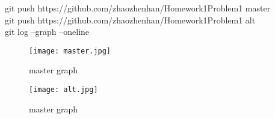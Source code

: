 \documentclass[12pt]{article}
\begin{document}
git push https://github.com/zhaozhenhan/Homework1Problem1 master\\
git push https://github.com/zhaozhenhan/Homework1Problem1 alt\\
git log --graph --oneline\\
\begin{figure}[h]
    \begin{center}
        \texttt{[image: master.jpg]}
    \end{center}
    \caption{master graph}
    \label{fig:branch}
\end{figure}
\begin{figure}[h]
    \begin{center}
        \texttt{[image: alt.jpg]}
    \end{center}
    \caption{master graph}
    \label{fig:branch}
\end{figure}
\end{document}
